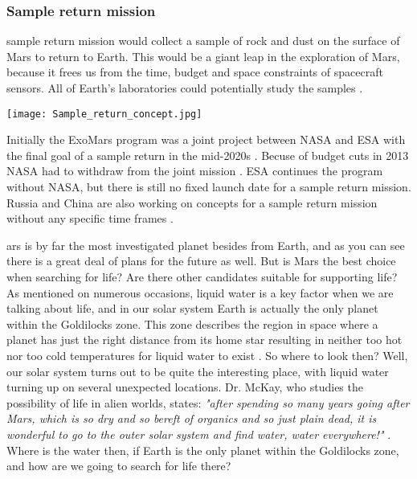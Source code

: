 \begin{multicols}{2}
\subsubsection{Sample return mission}

 sample return mission would collect a sample of rock and dust on the surface of Mars to return to Earth.
This would be a giant leap in the exploration of Mars, because it frees us from the time, budget and space constraints of spacecraft sensors.
All of Earth's laboratories could potentially study the samples \cite{EarthAnalysis}.
 
\begin{center}
	\texttt{[image: Sample\_return\_concept.jpg]}
\end{center}

Initially the ExoMars program was a joint project between NASA and ESA with the final goal of a sample return in the mid-2020s \cite{FPlan15}.
Becuse of budget cuts in 2013 NASA had to withdraw from the joint mission \cite{FPlan16}.
ESA continues the program without NASA, but there is still no fixed launch date for a sample return mission.
Russia and China are also working on concepts for a sample return mission without any specific time frames \cite{RussiaPlan} \cite{ChinaPlan}.

ars is by far the most investigated planet besides from Earth, and as you can see there is a great deal of plans for the future as well.
But is Mars the best choice when searching for life?
Are there other candidates suitable for supporting life? 
As mentioned on numerous occasions, liquid water is a key factor when we are talking about life, and in our solar system Earth is actually the only planet within the Goldilocks zone.
This zone describes the region in space where a planet has just the right distance from its home star resulting in neither too hot nor too cold temperatures for liquid water to exist \cite{FPlan26}.
So where to look then?
Well, our solar system turns out to be quite the interesting place, with liquid water turning up on several unexpected locations. 
Dr. McKay, who studies the possibility of life in alien worlds, states: \emph{"after spending so many years going after Mars, which is so dry and so bereft of organics and so just plain dead, it is wonderful to go to the outer solar system and find water, water everywhere!"} \cite{FPlan09}.
Where is the water then, if Earth is the only planet within the Goldilocks zone, and how are we going to search for life there?


\end{multicols}
